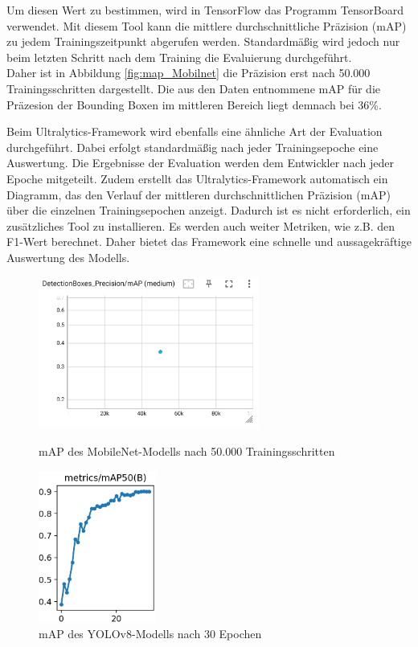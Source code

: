 Um diesen Wert zu bestimmen, wird in TensorFlow das Programm TensorBoard verwendet. Mit diesem Tool kann die mittlere durchschnittliche Präzision (\ac{mAP}) zu jedem Trainingszeitpunkt abgerufen werden. Standardmäßig wird jedoch nur beim letzten Schritt nach dem Training die Evaluierung durchgeführt.
\\
Daher ist in Abbildung \ref{fig:map_Mobilnet} die Präzision erst nach 50.000 Trainingsschritten dargestellt. Die aus den Daten entnommene \ac{mAP} für die Präzesion der Bounding Boxen im mittleren Bereich liegt demnach bei 36\%.

Beim Ultralytics-Framework wird ebenfalls eine ähnliche Art der Evaluation durchgeführt. Dabei erfolgt standardmäßig nach jeder Trainingsepoche eine Auswertung. Die Ergebnisse der Evaluation werden dem Entwickler nach jeder Epoche mitgeteilt. Zudem erstellt das Ultralytics-Framework automatisch ein Diagramm, das den Verlauf der mittleren durchschnittlichen Präzision (\ac{mAP}) über die einzelnen Trainingsepochen anzeigt. Dadurch ist es nicht erforderlich, ein zusätzliches Tool zu installieren. Es werden auch weiter Metriken, wie z.B. den F1-Wert berechnet. Daher bietet das Framework eine schnelle und aussagekräftige Auswertung des Modells.

\begin{figure}[H]
    \centering
    \begin{minipage}{0.48\textwidth}
        \centering
        \includegraphics[height=5cm]{images/mobileNet_map.png}
        \caption{\ac{mAP} des MobileNet-Modells nach 50.000 Trainingsschritten}
        \label{fig:map_Mobilnet}
    \end{minipage}
    \hfill
    \begin{minipage}{0.48\textwidth}
        \centering
        \includegraphics[height=5cm]{images/P_curve.png}
        \caption{\ac{mAP} des YOLOv8-Modells nach 30 Epochen}
        \label{fig:map_yolo}
    \end{minipage}
\end{figure}

